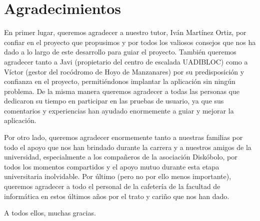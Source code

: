 
\chapter*{Agradecimientos}

En primer lugar, queremos agradecer a nuestro tutor, Iván Martínez Ortiz, por confiar en el proyecto que propusimos y por todos los valiosos consejos que nos ha dado a lo largo de este desarrollo para guiar el proyecto. También queremos agradecer tanto a Javi (propietario del centro de escalada UADIBLOC) como a Víctor (gestor del rocódromo de Hoyo de Manzanares) por su predisposición y confianza en el proyecto, permitiéndonos implantar la aplicación sin ningún problema. De la misma manera queremos agradecer a todas las personas que dedicaron su tiempo en participar en las pruebas de usuario, ya que sus comentarios y experiencias han ayudado enormemente a guiar y mejorar la aplicación.

Por otro lado, queremos agradecer enormemente tanto a nuestras familias por todo el apoyo que nos han brindado durante la carrera y a nuestros amigos de la universidad, especialmente a los compañeros de la asociación Diskóbolo, por todos los momentos compartidos y el apoyo mutuo durante esta etapa universitaria inolvidable. Por último (pero no por ello menos importante), queremos agradecer a todo el personal de la cafetería de la facultad de informática en estos últimos años por el trato y cariño que nos han dado.

A todos ellos, muchas gracias.











